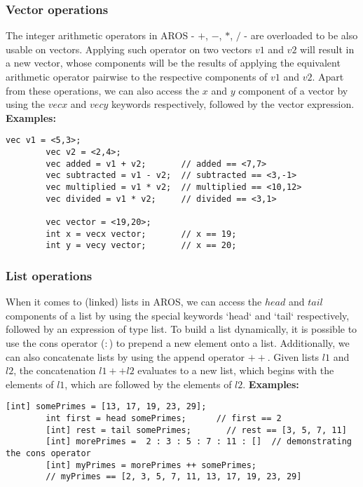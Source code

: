 \subsubsection{Vector operations}
    The integer arithmetic operators in AROS - $+$, $-$, $*$, $/$ - are overloaded to be also usable on vectors. Applying such operator on two vectors $v1$ and $v2$ will result in a new vector, whose components will be the results of applying the equivalent arithmetic operator pairwise to the respective components of $v1$ and $v2$. 
    \newline Apart from these operations, we can also access the $x$ and $y$ component of a vector by using the $vecx$ and $vecy$ keywords respectively, followed by the vector expression.
    \newline \textbf{Examples:}
    \begin{lstlisting}[language=aros,caption=Vector operation examples]
        vec v1 = <5,3>;
        vec v2 = <2,4>;
        vec added = v1 + v2;       // added == <7,7>
        vec subtracted = v1 - v2;  // subtracted == <3,-1>
        vec multiplied = v1 * v2;  // multiplied == <10,12>
        vec divided = v1 * v2;     // divided == <3,1>
        
        vec vector = <19,20>;
        int x = vecx vector;       // x == 19;
        int y = vecy vector;       // x == 20;
    \end{lstlisting}
\subsubsection{List operations}
    When it comes to (linked) lists in AROS, we can access the $head$ and $tail$ components of a list by using the special keywords `head` and `tail` respectively, followed by an expression of type list. To build a list dynamically, it is possible to use the cons operator ($:$) to prepend a new element onto a list. Additionally, we can also concatenate lists by using the append operator $++$. Given lists $l1$ and $l2$, the concatenation $l1 ++ l2$ evaluates to a new list, which begins with the elements of $l1$, which are followed by the elements of $l2$.
    \newline \textbf{Examples:}
    \begin{lstlisting}[language=aros,caption=List operation examples]
        [int] somePrimes = [13, 17, 19, 23, 29];
        int first = head somePrimes;      // first == 2
        [int] rest = tail somePrimes;       // rest == [3, 5, 7, 11]
        [int] morePrimes =  2 : 3 : 5 : 7 : 11 : []  // demonstrating the cons operator
        [int] myPrimes = morePrimes ++ somePrimes;
        // myPrimes == [2, 3, 5, 7, 11, 13, 17, 19, 23, 29]
    \end{lstlisting}

